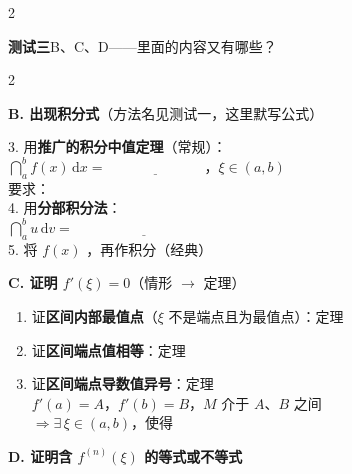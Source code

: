 \documentclass[a4paper,12pt]{article}
\newcommand{\blank}[1][3em]{\underline{\hspace{#1}}}
\begin{document}
\begin{multicols}{2}
\end{multicols}

\newpage

\textbf{测试三}\quad B、C、D——里面的内容又有哪些？

\vspace{1em}

\begin{multicols}{2}

\textbf{B. 出现积分式}（方法名见测试一，这里默写公式）

\vspace{0.6em}

3. 用\textbf{推广的积分中值定理}（常规）：
\\$\dint_{a}^{b} f(x)\,\mathrm{d}x = \blank[7em]$，$\xi \in (a, b)$
\\要求：\blank[9em]
\\[1.5em]
4. 用\textbf{分部积分法}：
\\$\dint_{a}^{b} u\,\mathrm{d}v = \blank[10em]$
\\[1.5em]
5. 将 $f(x)$ \blank[5em]，再作积分（经典）

\vspace{1.2em}

\textbf{C. 证明 $f'(\xi) = 0$}（情形 $\to$ 定理）

\vspace{0.6em}

\begin{enumerate}[label=\arabic*., leftmargin=1.8em, itemsep=1.7em]
    \item 证\textbf{区间内部最值点}（$\xi$ 不是端点且为最值点）：\blank[6em]定理
    \item 证\textbf{区间端点值相等}：\blank[6em]定理
    \item 证\textbf{区间端点导数值异号}：\blank[8em]定理
          \\$f'(a) = A$，$f'(b) = B$，$M$ 介于 $A$、$B$ 之间
          \\$\Rightarrow \exists\,\xi \in (a, b)$，使得 \blank[5em]
\end{enumerate}

\vspace{1.2em}

\textbf{D. 证明含 $f^{(n)}(\xi)$ 的等式或不等式}

\vspace{0.6em}


\end{multicols}
\end{document}
